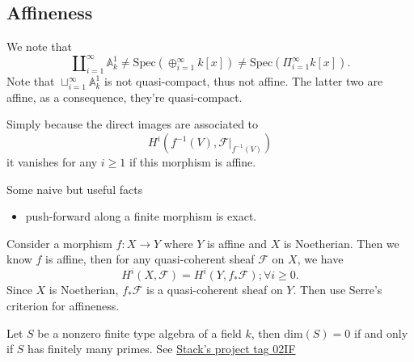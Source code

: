 \documentclass[../main.tex]{subfiles}
\begin{document}
\subsection{Affineness}
\begin{example}
We note that $$\amalg_{i=1}^{\infty} \mathbb{A}_{k}^{1}\neq \mathrm{Spec}(\oplus_{i=1}^{\infty}k[x])\neq \mathrm{Spec}(\Pi_{i=1}^{\infty}k[x]).$$
Note that $\sqcup_{i=1}^{\infty} \mathbb{A}_{k}^{1}$ is not quasi-compact, thus not affine. The latter two are affine, as a consequence, they're quasi-compact.
\end{example}
\begin{example}
Simply because the direct images are associated to 
$$H^{i}(f^{-1}(V),\mathscr{F}|_{f^{-1}(V)})$$
it vanishes for any $i\geq 1$ if this morphism is affine.
\end{example}
\begin{remark}
Some naive but useful facts
\begin{itemize}
    \item push-forward along a finite morphism is exact.
\end{itemize}
\end{remark}


\begin{example}
Consider a morphism $f:X\rightarrow Y$ where $Y$ is affine and $X$ is Noetherian. Then we know $f$ is affine, then for any quasi-coherent sheaf $\mathscr{F}$ on $X$, we have 
$$H^{i}(X,\mathscr{F})=H^{i}(Y, f_{*}\mathscr{F});\forall i\geq 0.$$
Since $X$ is Noetherian, $f_{*}\mathscr{F}$ is a quasi-coherent sheaf on $Y$. Then use Serre's criterion for affineness.
\end{example}
\begin{example}
\end{example}
\begin{remark}
Let $S$ be a nonzero finite type algebra of a field $k$, then $\mathrm{dim}(S)=0$ if and only if $S$ has finitely many primes. See
\href{http://stacks.math.columbia.edu/tag/02IF}{Stack's project tag 02IF}
\end{remark}
\end{document}
